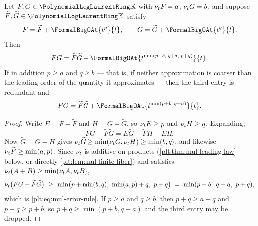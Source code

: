 \begin{corollary}
\label{plt:cor:mul-error-rule}
Let $F,G\in\PLlau$ with $\nu_{t} F=a$, $\nu_{t} G=b$, and suppose
$\widetilde F,\widetilde G\in\PLlau$ satisfy
\[
 F=\widetilde F+\FormalBigOAt{t^{p}}{t},
 \qquad
 G=\widetilde G+\FormalBigOAt{t^{q}}{t}.
\]
Then
\begin{equation}\label{plt:eq:mul-error-rule}
 FG=\widetilde F\widetilde G
 +\FormalBigOAt{t^{\min(p+b,\;q+a,\;p+q)}}{t}.
\end{equation}
If in addition $p\ge a$ and $q\ge b$ --- that is, if neither approximation is
coarser than the leading order of the quantity it approximates --- then the
third entry is redundant and
\begin{equation}\label{plt:eq:mul-error-rule-normalized}
 FG=\widetilde F\widetilde G
 +\FormalBigOAt{t^{\min(p+b,\;q+a)}}{t}.
\end{equation}
\end{corollary}

\begin{proof}
Write $E=F-\widetilde F$ and $H=G-\widetilde G$, so $\nu_{t} E\ge p$ and
$\nu_{t} H\ge q$.  Expanding,
\begin{equation}\label{plt:eq:mul-error-expansion}
 FG-\widetilde F\widetilde G
 =E\widetilde G+\widetilde FH+EH .
\end{equation}
Now $\widetilde G=G-H$ gives
$\nu_{t}\widetilde G\ge\min(\nu_{t} G,\nu_{t} H)\ge\min(b,q)$, and likewise
$\nu_{t}\widetilde F\ge\min(a,p)$.  Since $\nu_{t}$ is additive on products
(\cref{plt:thm:mul-leading-law} below, or directly
\cref{plt:lem:mul-finite-fiber}) and satisfies
$\nu_{t}(A+B)\ge\min(\nu_{t} A,\nu_{t} B)$,
\[
 \nu_{t}\bigl(FG-\widetilde F\widetilde G\bigr)
 \ \ge\
 \min\bigl(p+\min(b,q),\ \min(a,p)+q,\ p+q\bigr)
 \ =\ \min(p+b,\ q+a,\ p+q),
\]
which is \eqref{plt:eq:mul-error-rule}.  If $p\ge a$ and $q\ge b$, then
$p+q\ge a+q$ and $p+q\ge p+b$, so $p+q\ge\min(p+b,q+a)$ and the third entry
may be dropped.
\end{proof}

